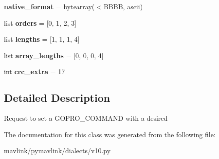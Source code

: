 \begin{DoxyCompactItemize}
\mbox{\label{classpymavlink_1_1dialects_1_1v10_1_1MAVLink__gopro__set__request__message_a81e2ff893c9865b0cc587a372a5edb01}} 
{\bfseries native\+\_\+format} = bytearray(\textquotesingle{}$<$B\+B\+BB\textquotesingle{}, \textquotesingle{}ascii\textquotesingle{})
\item 
\mbox{\label{classpymavlink_1_1dialects_1_1v10_1_1MAVLink__gopro__set__request__message_acfd1a1ff4b26f0139b64f52fde0545eb}} 
list {\bfseries orders} = \mbox{[}0, 1, 2, 3\mbox{]}
\item 
\mbox{\label{classpymavlink_1_1dialects_1_1v10_1_1MAVLink__gopro__set__request__message_a4b4410e255a74875462432c5e4bc7325}} 
list {\bfseries lengths} = \mbox{[}1, 1, 1, 4\mbox{]}
\item 
\mbox{\label{classpymavlink_1_1dialects_1_1v10_1_1MAVLink__gopro__set__request__message_a1477ed033b7d948275bdd4041adaf22e}} 
list {\bfseries array\+\_\+lengths} = \mbox{[}0, 0, 0, 4\mbox{]}
\item 
\mbox{\label{classpymavlink_1_1dialects_1_1v10_1_1MAVLink__gopro__set__request__message_a9510df58e8fc78077d273e6b0743425d}} 
int {\bfseries crc\+\_\+extra} = 17
\end{DoxyCompactItemize}


\subsection{Detailed Description}
\begin{DoxyVerb}Request to set a GOPRO_COMMAND with a desired
\end{DoxyVerb}
 

The documentation for this class was generated from the following file\+:\begin{DoxyCompactItemize}
\item 
mavlink/pymavlink/dialects/v10.\+py\end{DoxyCompactItemize}
